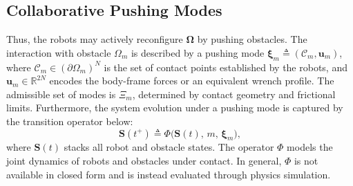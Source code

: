 \subsection{Collaborative Pushing Modes}\label{ss:interaction_mode}
Thus, the robots may actively reconfigure $\boldsymbol{\Omega}$ by pushing obstacles.
The interaction with obstacle $\Omega_m$ is described by a pushing mode
$\boldsymbol{\xi}_m\triangleq(\mathcal{C}_m,\mathbf{u}_m)$,
where $\mathcal{C}_m\in(\partial\Omega_m)^N$ is the set of contact points
established by the robots, and $\mathbf{u}_m\in\mathbb{R}^{2N}$ encodes the body-frame forces
or an equivalent wrench profile. The admissible set of
modes is $\Xi_m$, determined by contact geometry and frictional limits.
Furthermore, the system evolution under a pushing mode
is captured by the transition operator below:
\begin{equation}\label{eq:transition}
  \mathbf{S}(t^+)\triangleq\Phi\big(\mathbf{S}(t),\,m,\,\boldsymbol{\xi}_m\big),
\end{equation}
where $\mathbf{S}(t)$ stacks all robot and obstacle states. The operator
$\Phi$ models the joint dynamics of robots and obstacles under contact. In
general, $\Phi$ is not available in closed form and is instead evaluated
through physics simulation.

